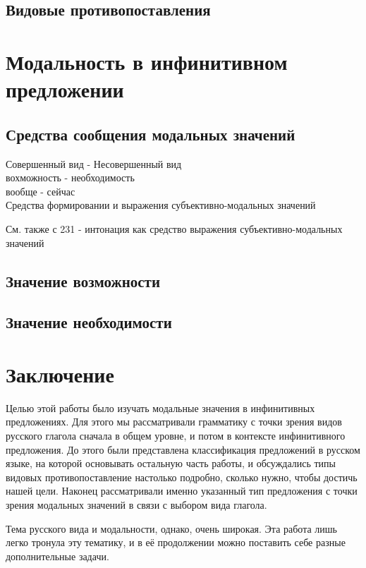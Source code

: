 \documentclass{article}
\begin{document}
\subsection{Видовые противопоставления}

\section{Модальность в инфинитивном предложении}

\subsection{Средства сообщения модальных значений}

	Совершенный вид -	Несовершенный вид \\
	вохможность 	- 	необходимость \\
	вообще 			-	сейчас \\


Средства формировании и выражения субъективно-модальных значений

См. также с 231 - интонация как средство выражения субъективно-модальных значений

\subsection{Значение возможности}
\subsection{Значение необходимости}

\section{Заключение}

Целью этой работы было изучать модальные значения в инфинитивных предложениях. Для этого мы рассматривали грамматику с точки зрения видов русского глагола сначала в общем уровне, и потом в контексте инфинитивного предложения. До этого были представлена классификация предложений в русском языке, на которой основывать остальную часть работы, и обсуждались типы видовых противопоставление настолько подробно, сколько нужно, чтобы достичь нашей цели. Наконец рассматривали именно указанный тип предложения с точки зрения модальных значений в связи с выбором вида глагола.

Тема русского вида и модальности, однако, очень широкая. Эта работа лишь легко тронула эту тематику, и в её продолжении можно поставить себе разные дополнительные задачи. 
\end{document}
